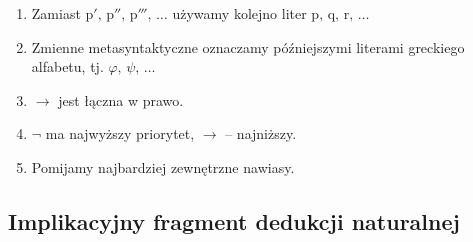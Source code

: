 \begin{konwencja*}$ $\newline 
  \begin{enumerate}
    \item Zamiast \(\mathrm{p'},\, \mathrm{p''},\, \mathrm{p'''},\, \dots\) używamy kolejno liter \(\mathrm{p},\, \mathrm{q},\, \mathrm{r},\, \dots\)
    \item Zmienne metasyntaktyczne oznaczamy późniejszymi literami greckiego alfabetu, tj. \(\varphi,\, \psi,\, \dots\)
    \item \(\rightarrow\) jest łączna w prawo.
    \item \(\lnot\) ma najwyższy priorytet, \(\rightarrow\) – najniższy.
    \item Pomijamy najbardziej zewnętrzne nawiasy.
  \end{enumerate}
\end{konwencja*}

\subsection{Implikacyjny fragment dedukcji naturalnej}

